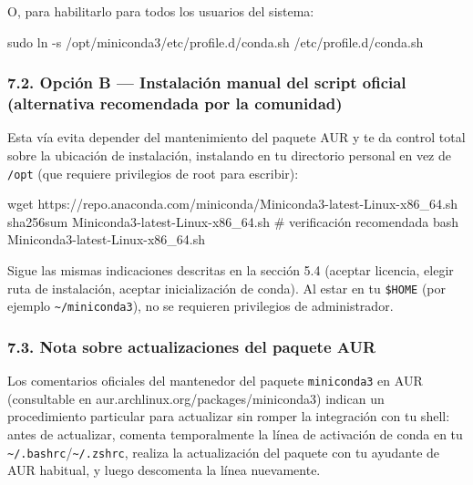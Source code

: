 \documentclass[
  doc,
  floatsintext,
  longtable,
  a4paper,
  nolmodern,
  notxfonts,
  notimes,
  12pt,
  colorlinks=true,linkcolor=blue,citecolor=blue,urlcolor=blue]{apa7}
\newenvironment{Shaded}{\begin{snugshade}}{\end{snugshade}}
\newcommand{\AttributeTok}[1]{\textcolor[rgb]{0.40,0.45,0.13}{#1}}
\newcommand{\CommentTok}[1]{\textcolor[rgb]{0.37,0.37,0.37}{#1}}
\newcommand{\FunctionTok}[1]{\textcolor[rgb]{0.28,0.35,0.67}{#1}}
\newcommand{\NormalTok}[1]{\textcolor[rgb]{0.00,0.23,0.31}{#1}}
\begin{document}
O, para habilitarlo para todos los usuarios del sistema:

\begin{Shaded}
\begin{Highlighting}[]
\FunctionTok{sudo}\NormalTok{ ln }\AttributeTok{{-}s}\NormalTok{ /opt/miniconda3/etc/profile.d/conda.sh /etc/profile.d/conda.sh}
\end{Highlighting}
\end{Shaded}

\subsubsection{7.2. Opción B --- Instalación manual del script oficial
(alternativa recomendada por la
comunidad)}\label{opciuxf3n-b-instalaciuxf3n-manual-del-script-oficial-alternativa-recomendada-por-la-comunidad}

Esta vía evita depender del mantenimiento del paquete AUR y te da
control total sobre la ubicación de instalación, instalando en tu
directorio personal en vez de \texttt{/opt} (que requiere privilegios de
root para escribir):

\begin{Shaded}
\begin{Highlighting}[]
\FunctionTok{wget}\NormalTok{ https://repo.anaconda.com/miniconda/Miniconda3{-}latest{-}Linux{-}x86\_64.sh}
\FunctionTok{sha256sum}\NormalTok{ Miniconda3{-}latest{-}Linux{-}x86\_64.sh   }\CommentTok{\# verificación recomendada}
\FunctionTok{bash}\NormalTok{ Miniconda3{-}latest{-}Linux{-}x86\_64.sh}
\end{Highlighting}
\end{Shaded}

Sigue las mismas indicaciones descritas en la sección 5.4 (aceptar
licencia, elegir ruta de instalación, aceptar inicialización de conda).
Al estar en tu \texttt{\$HOME} (por ejemplo
\texttt{\textasciitilde{}/miniconda3}), no se requieren privilegios de
administrador.

\subsubsection{7.3. Nota sobre actualizaciones del paquete
AUR}\label{nota-sobre-actualizaciones-del-paquete-aur}

Los comentarios oficiales del mantenedor del paquete \texttt{miniconda3}
en AUR (consultable en aur.archlinux.org/packages/miniconda3) indican un
procedimiento particular para actualizar sin romper la integración con
tu shell: antes de actualizar, comenta temporalmente la línea de
activación de conda en tu
\texttt{\textasciitilde{}/.bashrc}/\texttt{\textasciitilde{}/.zshrc},
realiza la actualización del paquete con tu ayudante de AUR habitual, y
luego descomenta la línea nuevamente.
\end{document}
